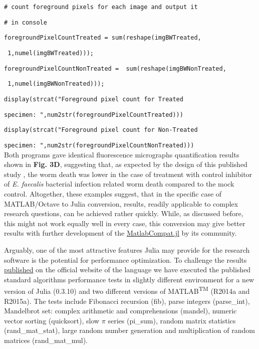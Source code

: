 \verb|# count foreground pixels for each image and output it|

\verb|# in console|

\verb|foregroundPixelCountTreated = sum(reshape(imgBWTreated,|

\verb| 1,numel(imgBWTreated)));|

\verb|foregroundPixelCountNonTreated =  sum(reshape(imgBWNonTreated,|

\verb| 1,numel(imgBWNonTreated)));|

\verb|display(strcat("Foreground pixel count for Treated|

\verb|specimen: ",num2str(foregroundPixelCountTreated)))|

\verb|display(strcat("Foreground pixel count for Non-Treated|

\verb|specimen: ",num2str(foregroundPixelCountNonTreated)))|\\


Both programs gave identical fluorescence micrographs quantification results shown in \textbf{Fig. 3D}, suggesting that, as expected by the design of this published study \cite{Moy_2009}, the worm death was lower in the case of treatment with control inhibitor of \textit{E. faecalis} bacterial infection related worm death compared to the mock control. Altogether, these examples suggest, that in the specific case of MATLAB/Octave to Julia conversion, results, readily applicable to complex research questions, can be achieved rather quickly. While, as discussed before, this might not work equally well in every case, this conversion may give better results with further development of the \href{https://github.com/MatlabCompat/MatlabCompat.jl}{MatlabCompat.jl} by its community.


Arguably, one of the most attractive features Julia may provide for the research software is the potential for performance optimization. To challenge the results \href{http://julialang.org/benchmarks/}{published} on the official website of the language we have executed the published standard algorithms performance tests in slightly different environment for a new version of Julia (0.3.10) and two different versions of MATLAB\textsuperscript{TM} (R2014a and R2015a). The tests include Fibonacci recursion (fib), parse integers (parse\_int), Mandelbrot set: complex arithmetic and comprehensions (mandel), numeric vector sorting (quicksort), slow $\pi$ series (pi\_sum), random matrix statistics (rand\_mat\_stat), large random number generation and multiplication of random matrices (rand\_mat\_mul).

